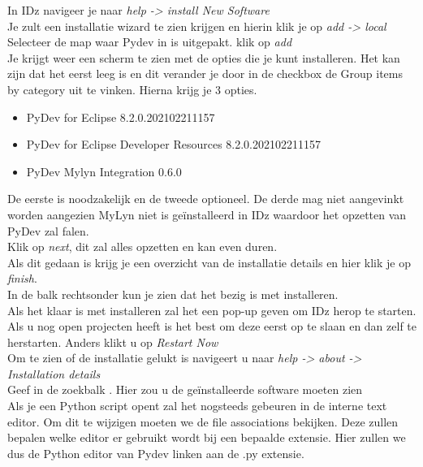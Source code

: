 In IDz navigeer je naar  \textit{help -> install New Software}  \\

Je zult een installatie wizard te zien krijgen en hierin klik je op \textit{add -> local} \\

Selecteer de map waar Pydev in is uitgepakt. klik op \textit{add} \\

Je krijgt weer een scherm te zien met de opties die je kunt installeren. Het kan zijn dat het eerst leeg is en dit verander je door in de checkbox de Group items by category uit te vinken. Hierna krijg je 3 opties.

\begin{itemize}
    \item PyDev for Eclipse 8.2.0.202102211157
    \item PyDev for Eclipse Developer Resources 8.2.0.202102211157
    \item PyDev Mylyn Integration 0.6.0
\end{itemize}

De eerste is noodzakelijk en de tweede optioneel. De derde mag niet aangevinkt worden aangezien MyLyn niet is geïnstalleerd in IDz waardoor het opzetten van PyDev zal falen. \\ 

Klik op \textit{next}, dit zal alles opzetten en kan even duren. \\

Als dit gedaan is krijg je een overzicht van de installatie details en hier klik je op \textit{finish}. \\

In de balk rechtsonder kun je zien dat het bezig is met installeren. \\

Als het klaar is met installeren zal het een pop-up geven om IDz herop te starten. Als u nog open projecten heeft is het best om deze eerst op te slaan en dan zelf te herstarten. Anders klikt u op \textit{Restart Now} \\ 

Om te zien of de installatie gelukt is navigeert u naar \textit{help -> about -> Installation details} \\

Geef in de zoekbalk . Hier zou u de geïnstalleerde software moeten zien \\ 

Als je een Python script opent zal het nogsteeds gebeuren in de interne text editor. Om dit te wijzigen moeten we de file associations bekijken. Deze zullen bepalen welke editor er gebruikt wordt bij een bepaalde extensie. Hier zullen we dus de Python editor van Pydev linken aan de .py extensie. \\

